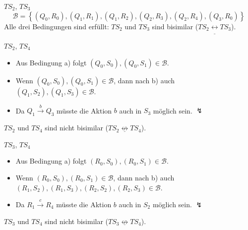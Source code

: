 \documentclass[a4paper]{scrartcl}
\begin{document}
\begin{description}
    \item $TS_2$, $TS_3$
        \begin{equation*}
            \mathcal{B} = \left\{ (Q_0,R_0), (Q_1,R_1), (Q_1,R_2), (Q_2,R_3), (Q_2,R_4), (Q_3,R_0) \right\}
        \end{equation*}
        Alle drei Bedingungen sind erfüllt: $TS_2$ und $TS_3$ sind bisimilar
        ($TS_2  \underline{\leftrightarrow} TS_3$).

    \item $TS_2$, $TS_4$
        \begin{itemize}
            \item Aus Bedingung a) folgt $(Q_0,S_0), (Q_0,S_1) \in \mathcal{B}$.
            \item Wenn $(Q_0,S_0), (Q_0,S_1) \in \mathcal{B}$, dann nach b) auch
                $(Q_1,S_2), (Q_1,S_3) \in \mathcal{B}$.
            \item Da $Q_1 \stackrel{b}{\rightarrow} Q_3$ müsste die Aktion $b$
                auch in $S_3$ möglich sein. $\lightning$
        \end{itemize}
        $TS_2$ und $TS_4$ sind nicht bisimilar
        ($TS_2  \underline{\not\leftrightarrow} TS_4$).

    \item $TS_3$, $TS_4$
        \begin{itemize}
            \item Aus Bedingung a) folgt $(R_0,S_0), (R_0,S_1) \in \mathcal{B}$.
            \item Wenn $(R_0,S_0), (R_0,S_1) \in \mathcal{B}$, dann nach b) auch
                \\ $(R_1,S_2), (R_1,S_3), (R_2,S_2), (R_2,S_3) \in \mathcal{B}$.
            \item Da $R_1 \stackrel{c}{\rightarrow} R_4$ müsste die Aktion $b$
                auch in $S_2$ möglich sein. $\lightning$
        \end{itemize}
        $TS_3$ und $TS_4$ sind nicht bisimilar
        ($TS_3  \underline{\not\leftrightarrow} TS_4$).


\end{description}
\end{document}
